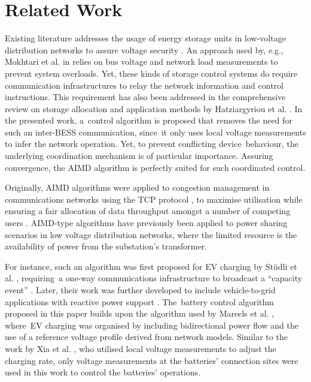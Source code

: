 \section{Related Work}
\label{ch1:sec:related-work}

Existing literature addresses the usage of energy storage units in low-voltage distribution networks to assure voltage security \cite{Sugihara2013, Toledo2013, Marra2013, Mokhtari2013, Atia2016}. An approach used by, e.g., Mokhtari et al. in \cite{Mokhtari2013} relies on bus voltage and network load measurements to prevent system overloads. Yet, these kinds of storage control systems do require communication infrastructures to relay the network information and control instructions. This requirement has also been addressed in the comprehensive review on storage allocation and application methods by Hatziargyriou et al. \cite{Hatziargyriou2015}. In the presented work, a~control algorithm is proposed that removes the need for such an inter-BESS communication, since~it only uses local voltage measurements to infer the network operation. Yet, to prevent conflicting device~behaviour, the underlying coordination mechanism is of particular importance. Assuring convergence, the AIMD algorithm is perfectly suited for such coordinated control.

Originally, AIMD algorithms were applied to congestion management in communications networks using the TCP protocol \cite{Chiu1989}, to maximise utilisation while ensuring a fair allocation of data throughput amongst a number of competing users \cite{Wirth2014}. AIMD-type algorithms have previously been applied to power sharing scenarios in low voltage distribution networks, where the limited resource is the availability of power from the substation's transformer.

For instance, such an algorithm was first proposed for EV charging by St{\"{u}}dli et al. \cite{Studli2012}, requiring~a one-way communications infrastructure to broadcast a ``capacity event'' \cite{Studli2014, Studli2014a}. Later, their work was further developed to include vehicle-to-grid applications with reactive power support \cite {Studli2015}. The~battery control algorithm proposed in this paper builds upon the algorithm used by Mareels et al. \cite{Mareels2014}, where~EV charging was organised by including bidirectional power flow and the use of a reference voltage profile derived from network models. Similar to the work by Xia et al. \cite{Xia2014}, who utilised local voltage measurements to adjust the charging rate, only voltage measurements at the batteries' connection sites were used in this work to control the batteries' operations.

